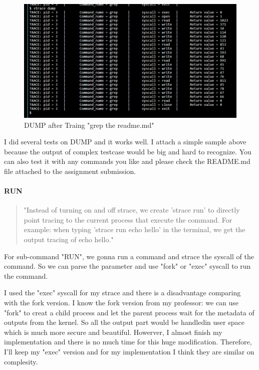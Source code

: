 \documentclass[11pt,oneside,a4paper]{article}
\begin{document}
\begin{figure}[H]
    \includegraphics[width=4.75in]{1-12.png}
    \centering
    \caption{DUMP after Traing "grep the readme.md"}
\end{figure}

I did several tests on DUMP and it works well. I attach a simple sample above because 
the output of complex testcase would be big and hard to recognize. 
You can also test it with any commands you like and please check the README.md file 
attached to the assignment submission.

\paragraph*{RUN}

\begin{quotation}
    "Instead of turning on and off strace, we create 'strace run' to directly point tracing to the current
process that execute the command. For example: when typing 'strace run echo hello' in the
terminal, we get the output tracing of echo hello."
\end{quotation}

For sub-command "RUN", we gonna run a command and strace the syscall of the command.
So we can parse the parameter and use "fork" or "exec" syscall to run the command.

I used the "exec" syscall for my strace and there is a disadvantage comparing with 
the fork version. I know the fork version from my professor: 
we can use "fork" to creat a child process and let the parent process wait for the 
metadata of outputs from the kernel. So all the output part would be handledin user 
space which is much more secure and beautiful. Howerver, I almost finish my implementation
and there is no much time for this huge modification. Therefore, I'll keep my "exec"
version and for my implementation I think they are similar on complesity.
\end{document}
